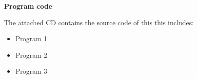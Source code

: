 \cleardoublepage{}
\thispagestyle{empty}
\huge\hspace{5cm}\textbf{Program code}\normalsize\vspace{2cm}

\noindent The attached CD contains the source code of this \getDoctypeShort{} this includes:
\begin{itemize}
    \item Program 1
    \item Program 2
    \item Program 3
\end{itemize}
